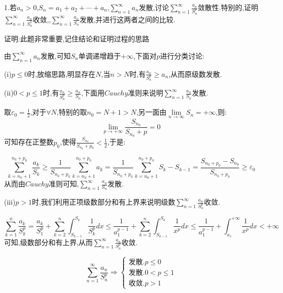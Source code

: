 \documentclass{ctexart}
\begin{document}
\begin{tcolorbox}[title = {综合性问题},colbacktitle=red!25!white,colback=white,arc = 2mm, outer arc = 2mm,fonttitle = \itshape, fontupper = \itshape, fontlower = \itshape]	
	1.若$a_{n} > 0$,$S_{n}=a_{1}+a_{2}+ \cdots +a_{n}$,$\sum\limits_{n=1}^{\infty}a_{n}$发散,讨论$\displaystyle{\sum_{n=1}^{\infty}\frac{a_{n}}{S_{n}^{p}}}$敛散性.特别的,证明$\displaystyle{\sum_{n=1}^{\infty}\frac{a_{n}}{S_{n}^{2}}}$收敛,,$\displaystyle{\sum_{n=1}^{\infty}\frac{a_{n}}{S_{n}}}$发散,并进行这两者之间的比较.\\
		\begin{tcolorbox}[colback=white,arc = 1mm, outer arc = 1mm,fonttitle = \itshape, fontupper = \itshape, fontlower = \itshape]
		{\color{red}证明:此题非常重要,记住结论和证明过程的思路}
		
	由$\displaystyle{\sum_{n=1}^{\infty} {a_{n}}}$发散,可知$S_{n}$单调递增趋于$+\infty$,下面对$p$进行分类讨论:
	
	(i)$p \le 0$时,{\color{red}放缩思路},明显存在$N$,当$n>N$时,有$\displaystyle{\frac{a_{n}}{S_{n}^{p}} \ge a_{n}}$,从而原级数发散.
	
	(ii)$0 < p \le 1$时,有$\displaystyle{\frac{a_{n}}{S_{n}^{p}} \ge \frac{a_{n}}{S_{n}}}$,下面用{\color{red}$Cauchy$准则}来说明$\displaystyle{\sum_{n=1}^{\infty}\frac{a_{n}}{S_{n}}}$发散.
	
    取$\varepsilon_{0}=\frac{1}{2}$,对于$\forall N$,特别的取$n_{0}=N+1>N$,另一面由$\lim\limits_{n \to \infty}S_{n}=+\infty$,则:
    $$\lim_{p \to +\infty}\frac{S_{n_{0}}}{S_{n_{0}}+p}=0$$
    可知存在正整数$p_{0}$,使得$\displaystyle{\frac{S_{n_{0}}}{S_{n_{0}}+p_{0}}} <\frac{1}{2}$,于是:
    
    $$\sum_{k=n_{0}+1}^{n_{0}+p_{0}}\frac{a_{k}}{S_{k}} \ge \frac{1}{S_{n_{0}+p_{0}}}\sum_{k=n_{0}+1}^{n_{0}+p_{0}}a_{k}=\frac{1}{S_{n_{0}+p_{0}}}\sum_{k=n_{0}+1}^{n_{0}+p_{0}}S_{k}-S_{k-1}=\frac{S_{n_{0}+p_{0}}-S_{n_{0}}}{S_{n_{0}+p_{0}}} \ge \varepsilon_{0} $$
	从而由$Cauchy$准则可知,$\displaystyle{\sum_{n=1}^{\infty}\frac{a_{n}}{S_{n}}}$发散.
	
	(iii)$p > 1$时,我们利用{\color{red}正项级数部分和有上界}来说明级数$\displaystyle{\sum_{n=1}^{\infty}\frac{a_{n}}{S_{n}^{p}}}$收敛.
	
     $$\sum_{k=1}^{n}\frac{a_{k}}{S_{k}^{p}}=\frac{a_{k}}{S_{1}^{p}}+\sum_{k=2}^{n}\int_{S_{k-1}}^{S_{k}}\frac{1}{S_{k}^{p}}dx \le
      \frac{1}{a_{1}^{p-1}}+\sum_{k=2}^{n}\int_{S_{k-1}}^{S_{k}}\frac{1}{x^{p}}dx  \le  \frac{1}{a_{1}^{p-1}} +\int_{a_{1}}^{+\infty}\frac{1}{x^{p}}dx < +\infty $$
      可知,级数部分和有上界,从而$\displaystyle{\sum_{n=1}^{\infty}\frac{a_{n}}{S_{n}^{p}}}$收敛.
      
$$\displaystyle{\sum_{n=1}^{\infty}\frac{a_{n}}{S_{n}^{p}}} \Rightarrow
     \begin{cases}
      	{\text{发散.}}p \le 0\\
      	{\text{发散.}}0<p\le 1\\
      	{\text{收敛.}}p>1
      	
      \end{cases}
$$
	\end{tcolorbox}


	\end{tcolorbox}
\end{document}
